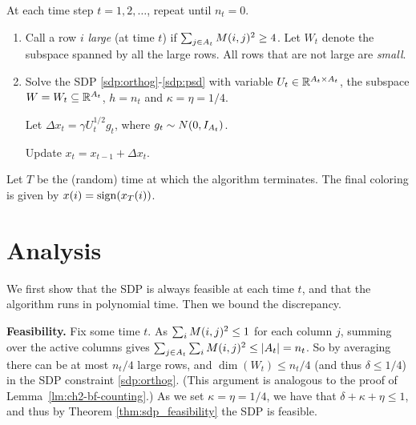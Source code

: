 \medskip 

  At each time step $t=1,2,\ldots$, repeat  until $n_t=0$.




 








\begin{enumerate}
\item Call a row $i$ \emph{large} (at time $t$)  if $\sum_{j \in A_t} M(i,j)^2 \geq 4$. Let $W_t$ denote the subspace spanned by all the large rows. All rows that are not large are \emph{small}.
    \item Solve the SDP \eqref{sdp:orthog}-\eqref{sdp:psd} with variable $U_t \in \mathbb{R}^{A_t \times A_t}$, the subspace $W = W_t \subseteq \mathbb{R}^{A_t}$, $h=n_t$ and $\kappa = \eta = 1/4$.  
 
     Let $\Delta x_t = \gamma U_t^{1/2} g_t$, where $g_t \sim N(0,I_{A_t})$. 
     
     Update $x_t = x_{t-1} + \Delta x_t$.
\end{enumerate}

\noindent Let $T$ be the (random) time at which the algorithm terminates. The final coloring is given by $x(i) = \operatorname{sign}(x_T(i))$.



\section{Analysis} 
\label{subsubsec:analysis_Banaszczyk}
We first show that the SDP is always feasible at each time $t$, and that the algorithm runs in polynomial time. Then we bound the discrepancy.

\medskip 
\noindent 
{\bf Feasibility.}
Fix some time $t$. As $\sum_i M(i,j)^2\leq 1$ for each column $j$,  summing over the active columns gives $\sum_{j \in A_t}\sum_i M(i,j)^2\leq |A_t|= n_t$. So by averaging there can be at most $n_t/4$ large rows, and  $\dim(W_t) \leq n_t/4$ (and thus $\delta\leq 1/4$) in the SDP constraint \eqref{sdp:orthog}. (This argument is analogous to the proof of Lemma~\ref{lm:ch2-bf-counting}.)
As we set $\kappa=\eta=1/4$, we have that $\delta + \kappa + \eta \leq 1$, and thus by Theorem \ref{thm:sdp_feasibility} the SDP is feasible.

